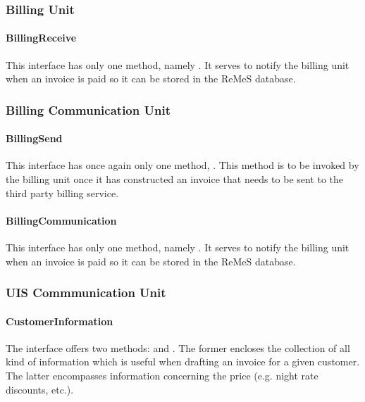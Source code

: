 \subsubsection{Billing Unit}

\paragraph{BillingReceive}

\npar This interface has only one method, namely . It serves to notify the billing unit when an invoice is paid so
it can be stored in the ReMeS database.

\subsubsection{Billing Communication Unit}

\paragraph{BillingSend}

\npar This interface has once again only one method, . This method is to be invoked by the billing unit once it has constructed
an invoice that needs to be sent to the third party billing service.

\paragraph{BillingCommunication}

\npar This interface has only one method, namely . It serves to notify the billing unit when an invoice is paid so
it can be stored in the ReMeS database.

\subsubsection{UIS Commmunication Unit}

\paragraph{CustomerInformation}

\npar The  interface offers two methods:
 and
. The former encloses the collection of all
kind of information which is useful when drafting an invoice for a given
customer. The latter encompasses information concerning the price (e.g.
night rate discounts, etc.).

